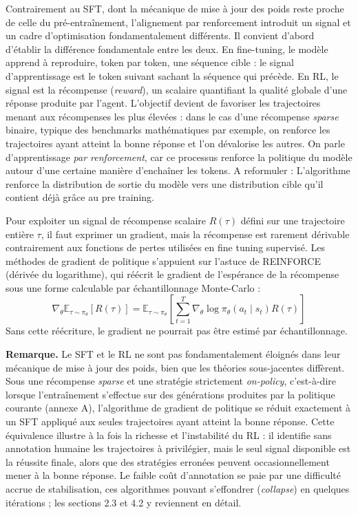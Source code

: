 \documentclass[11pt,a4paper]{article}
\begin{document}
Contrairement au SFT, dont la mécanique de mise à jour des poids reste proche de celle du pré-entraînement, l'alignement par renforcement introduit un signal et un cadre d'optimisation fondamentalement différents. Il convient d'abord d'établir la différence fondamentale entre les deux. En fine-tuning, le modèle apprend à reproduire, token par token, une séquence cible : le signal d'apprentissage est le token suivant sachant la séquence qui précède. En RL, le signal est la récompense (\emph{reward}), un scalaire quantifiant la qualité globale d'une réponse produite par l'agent. L'objectif devient de favoriser les trajectoires menant aux récompenses les plus élevées : dans le cas d'une récompense \emph{sparse} binaire, typique des benchmarks mathématiques par exemple, on renforce les trajectoires ayant atteint la bonne réponse et l'on dévalorise les autres. On parle d'apprentissage \emph{par renforcement}, car ce processus renforce la politique du modèle autour d'une certaine manière d'enchaîner les tokens. A reformuler : L'algorithme renforce la distribution de sortie du modèle vers une distribution cible qu'il contient déjà grâce au pre training.  

Pour exploiter un signal de récompense scalaire $R(\tau)$ défini sur une trajectoire entière $\tau$, il faut exprimer un gradient, mais la récompense est rarement dérivable contrairement aux fonctions de pertes utilisées en fine tuning supervisé. Les méthodes de gradient de politique s'appuient sur l'astuce de REINFORCE (dérivée du logarithme), qui réécrit le gradient de l'espérance de la récompense sous une forme calculable par échantillonnage Monte-Carlo :
\begin{equation}
\nabla_\theta \mathbb{E}_{\tau \sim \pi_\theta}[R(\tau)] = \mathbb{E}_{\tau \sim \pi_\theta} \left[ \sum_{t=1}^T \nabla_\theta \log \pi_\theta(a_t \mid s_t) R(\tau) \right]
\end{equation}
Sans cette réécriture, le gradient ne pourrait pas être estimé par échantillonnage.

\textbf{Remarque.} Le SFT et le RL ne sont pas fondamentalement éloignés dans leur mécanique de mise à jour des poids, bien que les théories sous-jacentes diffèrent. Sous une récompense \emph{sparse} et une stratégie strictement \emph{on-policy}, c'est-à-dire lorsque l'entraînement s'effectue sur des générations produites par la politique courante (annexe A), l'algorithme de gradient de politique se réduit exactement à un SFT appliqué aux seules trajectoires ayant atteint la bonne réponse. Cette équivalence illustre à la fois la richesse et l'instabilité du RL : il identifie sans annotation humaine les trajectoires à privilégier, mais le seul signal disponible est la réussite finale, alors que des stratégies erronées peuvent occasionnellement mener à la bonne réponse. Le faible coût d'annotation se paie par une difficulté accrue de stabilisation, ces algorithmes pouvant s'effondrer (\emph{collapse}) en quelques itérations ; les sections 2.3 et 4.2 y reviennent en détail.
\end{document}
